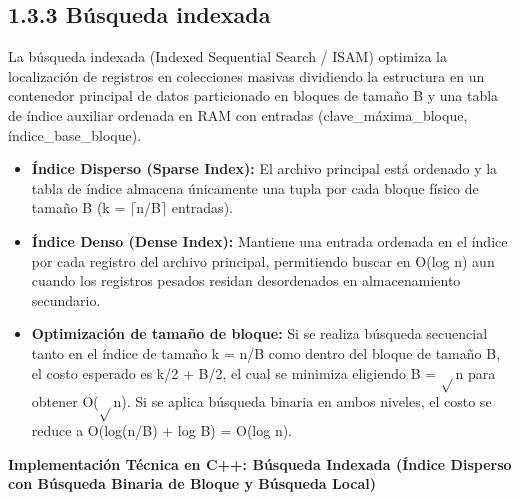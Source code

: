 \documentclass[11pt,letterpaper]{article}
\begin{document}
\subsection*{1.3.3 Búsqueda indexada}
La búsqueda indexada (Indexed Sequential Search / ISAM) optimiza la localización de registros en colecciones masivas dividiendo la estructura en un contenedor principal de datos particionado en bloques de tamaño B y una tabla de índice auxiliar ordenada en RAM con entradas (clave\_máxima\_bloque, índice\_base\_bloque).\par
\begin{itemize}
\setlength{\itemsep}{2pt}\setlength{\parskip}{0pt}
  \item \textbf{Índice Disperso (Sparse Index): }El archivo principal está ordenado y la tabla de índice almacena únicamente una tupla por cada bloque físico de tamaño B (k = $\lceil$n/B$\rceil$ entradas).
  \item \textbf{Índice Denso (Dense Index): }Mantiene una entrada ordenada en el índice por cada registro del archivo principal, permitiendo buscar en O(log n) aun cuando los registros pesados residan desordenados en almacenamiento secundario.
  \item \textbf{Optimización de tamaño de bloque: }Si se realiza búsqueda secuencial tanto en el índice de tamaño k = n/B como dentro del bloque de tamaño B, el costo esperado es k/2 + B/2, el cual se minimiza eligiendo B = $\sqrt{}$n para obtener O($\sqrt{}$n). Si se aplica búsqueda binaria en ambos niveles, el costo se reduce a O(log(n/B) + log B) = O(log n).
\end{itemize}
\vspace{4pt}\noindent\textbf{\color{ipnblue}Implementación Técnica en C++: Búsqueda Indexada (Índice Disperso con Búsqueda Binaria de Bloque y Búsqueda Local)}\par\vspace{-2pt}
\end{document}

